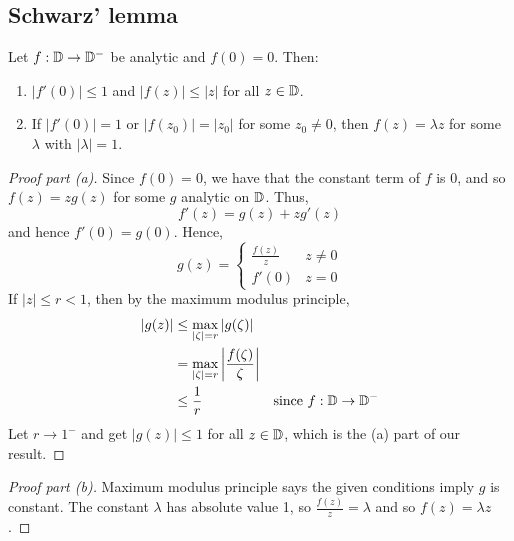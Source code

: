 \documentclass[12pt]{article}
\begin{document}
\subsection{Schwarz' lemma}
\begin{lemma}[Schwarz']
    Let $f:\mathbb{D}\to \mathbb{D}^-$ be analytic and $f(0)=0$. Then: \begin{enumerate}[label=(\alph*)]
        \item \(|f'(0)|\leq 1\) and $|f(z)|\leq |z|$ for all $z\in \mathbb{D}$.
        \item If $|f'(0)|=1$ or $|f(z_0)|=|z_0|$ for some $z_0\neq 0$, then $f(z)=\lambda z$ for some $\lambda$ with $|\lambda|=1$.
    \end{enumerate}
\end{lemma}

\begin{proof}[Proof part (a)]
    Since $f(0)=0$, we have that the constant term of $f$ is 0, and so $f(z)=zg(z)$ for some $g$ analytic on $\mathbb{D}$. Thus, \[f'(z)=g(z)+zg'(z)\] and hence $f'(0)=g(0)$. Hence, \[g(z)=\begin{cases}
        \frac{f(z)}{z} & z\neq 0\\
        f'(0) &z=0
    \end{cases}\]
    If $|z|\leq r<1$, then by the maximum modulus principle, \begin{align*}
        |g(z)|&\leq \max_{|\zeta|=r}|g(\zeta)|\\
        &= \max_{|\zeta|=r}\left|\frac{f(\zeta)}{\zeta}\right|\\
        &\leq \frac{1}{r} &\text{since }f:\mathbb{D}\to\mathbb{D}^-
    \end{align*}
    Let $r\to 1^-$ and get $|g(z)|\leq 1$ for all $z\in \mathbb{D}$, which is the (a) part of our result.
\end{proof}

\begin{proof}[Proof part (b)]
    Maximum modulus principle says the given conditions imply $g$ is constant. The constant $\lambda$ has absolute value 1, so $\frac{f(z)}{z}=\lambda$ and so $f(z)=\lambda z$.
\end{proof}
\end{document}
